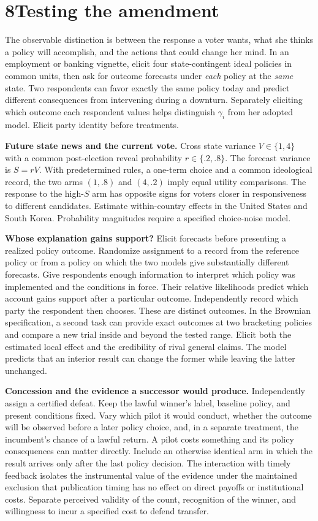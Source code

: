 \documentclass[11pt,letterpaper]{article}
\newcommand{\sect}[1]{\section*{\color{ink}#1}}
\newcommand{\lead}[1]{\textbf{#1}\enspace}
\begin{document}
\newpage
\sect{8\quad Testing the amendment}
The observable distinction is between the response a voter wants, what she thinks a policy will accomplish, and the actions that could change her mind. In an employment or banking vignette, elicit four state-contingent ideal policies in common units, then ask for outcome forecasts under \emph{each} policy at the \emph{same} state. Two respondents can favor exactly the same policy today and predict different consequences from intervening during a downturn. Separately eliciting which outcome each respondent values helps distinguish $\gamma_i$ from her adopted model. Elicit party identity before treatments.

\lead{Future state news and the current vote.} Cross state variance $V\in\{1,4\}$ with a common post-election reveal probability $r\in\{.2,.8\}$. The forecast variance is $S=rV$. With predetermined rules, a one-term choice and a common ideological record, the two arms $(1,.8)$ and $(4,.2)$ imply equal utility comparisons. The response to the high-$S$ arm has opposite signs for voters closer in responsiveness to different candidates. Estimate within-country effects in the United States and South Korea. Probability magnitudes require a specified choice-noise model.

\lead{Whose explanation gains support?} Elicit forecasts before presenting a realized policy outcome. Randomize assignment to a record from the reference policy or from a policy on which the two models give substantially different forecasts. Give respondents enough information to interpret which policy was implemented and the conditions in force. Their relative likelihoods predict which account gains support after a particular outcome. Independently record which party the respondent then chooses. These are distinct outcomes. In the Brownian specification, a second task can provide exact outcomes at two bracketing policies and compare a new trial inside and beyond the tested range. Elicit both the estimated local effect and the credibility of rival general claims. The model predicts that an interior result can change the former while leaving the latter unchanged.

\lead{Concession and the evidence a successor would produce.} Independently assign a certified defeat. Keep the lawful winner's label, baseline policy, and present conditions fixed. Vary which pilot it would conduct, whether the outcome will be observed before a later policy choice, and, in a separate treatment, the incumbent's chance of a lawful return. A pilot costs something and its policy consequences can matter directly. Include an otherwise identical arm in which the result arrives only after the last policy decision. The interaction with timely feedback isolates the instrumental value of the evidence under the maintained exclusion that publication timing has no effect on direct payoffs or institutional costs. Separate perceived validity of the count, recognition of the winner, and willingness to incur a specified cost to defend transfer.
\end{document}
